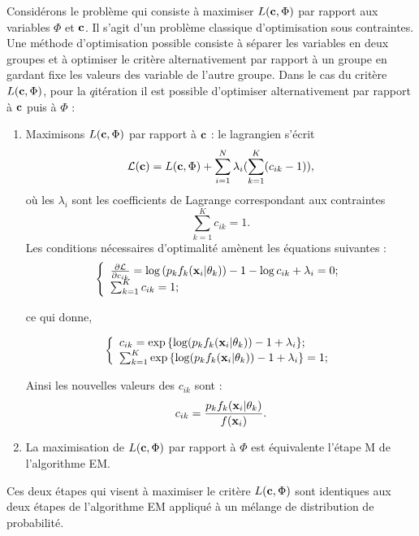 Consid\'erons le probl\`eme qui consiste \`a maximiser $L(\mbox{\bf c},\Phi)$ par
rapport aux variables $\Phi$ et $\mbox{\bf c}$. Il s'agit d'un probl\`eme
classique d'optimisation sous contraintes. Une m\'ethode d'optimisation
possible consiste \`a s\'eparer les variables en deux groupes et \`a optimiser
le crit\`ere alternativement par rapport \`a un groupe en gardant fixe  les 
valeurs des variable de l'autre groupe. Dans le cas du crit\`ere $L(\mbox{\bf c},\Phi)$,
pour la $q$\ieme it\'eration il est possible d'optimiser  alternativement 
par rapport \`a $\mbox{\bf c}$ puis \`a $\Phi$ :
\begin{enumerate}
\item Maximisons $L(\mbox{\bf c},\Phi)$ par rapport \`a $\mbox{\bf c}$ : le lagrangien s'\'ecrit
\begin{equation}
{\cal{L}}(\mbox{\bf c})=L(\mbox{\bf c},\Phi) + \sum_{i=1}^N \lambda_i (\sum_{k=1}^K (c_{ik}-1)),
\end{equation}
o\`u les $\lambda_i$ sont les coefficients de Lagrange correspondant aux 
contraintes 
$$\sum_{k=1}^K c_{ik}=1.$$ 
Les conditions n\'ecessaires d'optimalit\'e am\`enent les \'equations suivantes :
\[
\left \{ \begin{array}{l}
	 				\frac{\partial{\cal{L}}}{\partial c_{ik}}=
\log{(p_kf_k(\mbox{\bf x}_i|\theta_k))} -1 -\log{c_{ik}} + \lambda_i = 0 ; \\
				  \sum_{k=1}^K c_{ik}=1 ;
	               \end{array}
     		\right .
\]

ce qui donne,

\[
\left \{ \begin{array}{l}
	 				c_{ik}=
\exp{\{ \log(p_kf_k(\mbox{\bf x}_i|\theta_k)) -1 + \lambda_i \}};  \\
				  \sum_{k=1}^K \exp{\{ \log(p_kf_k(\mbox{\bf x}_i|\theta_k)) -1 + \lambda_i \}} =1;
	          \end{array}
     		\right .
\]




Ainsi les nouvelles valeurs des $c_{ik}$ sont :
\begin{equation}
c_{ik}=\frac{p_k f_k(\mbox{\bf x}_i | \theta_k)}{f(\mbox{\bf x}_i)}.
\end{equation}


\item La maximisation de  $L(\mbox{\bf c},\Phi)$ par rapport \`a $\Phi$ est 
\'equivalente l'\'etape M de l'algorithme EM.  
\end{enumerate}

Ces deux \'etapes qui visent \`a maximiser le crit\`ere $L(\mbox{\bf c},\Phi)$ sont
identiques aux deux \'etapes de l'algorithme EM appliqu\'e \`a un m\'elange
de distribution de probabilit\'e.

